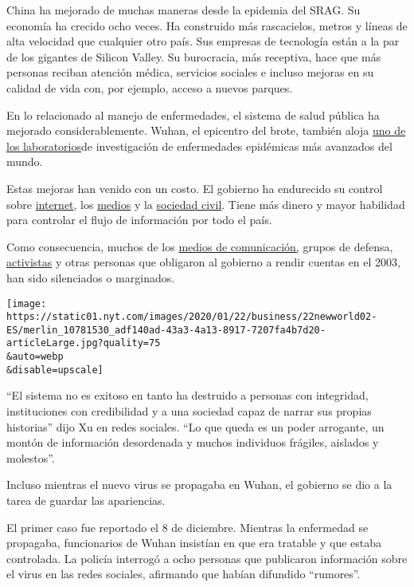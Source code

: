 China ha mejorado de muchas maneras desde la epidemia del SRAG. Su
economía ha crecido ocho veces. Ha construido más rascacielos, metros y
líneas de alta velocidad que cualquier otro país. Sus empresas de
tecnología están a la par de los gigantes de Silicon Valley. Su
burocracia, más receptiva, hace que más personas reciban atención
médica, servicios sociales e incluso mejoras en su calidad de vida con,
por ejemplo, acceso a nuevos parques.

En lo relacionado al manejo de enfermedades, el sistema de salud pública
ha mejorado considerablemente. Wuhan, el epicentro del brote, también
aloja
\href{https://twitter.com/ShanghaiEye/status/1093160842638446592}{uno de
los laboratorios}de investigación de enfermedades epidémicas más
avanzados del mundo.

Estas mejoras han venido con un costo. El gobierno ha endurecido su
control sobre
\href{https://www.nytimes.com/topic/destination/internet-censorship-in-china}{internet},
los
\href{https://www.nytimes.com/2019/07/12/world/asia/china-journalists-crackdown.html}{medios}
y la
\href{https://www.nytimes.com/2017/07/25/magazine/the-lonely-crusade-of-chinas-human-rights-lawyers.html}{sociedad
civil}. Tiene más dinero y mayor habilidad para controlar el flujo de
información por todo el país.

Como consecuencia, muchos de los
\href{https://www.nytimes.com/2004/01/07/international/asia/7-at-chinese-paper-held-after-articles-on-new-sars-case.html}{medios
de comunicación,} grupos de defensa,
\href{https://www.nytimes.com/2004/07/21/world/china-releases-the-sars-whistle-blower.html}{activistas}
y otras personas que obligaron al gobierno a rendir cuentas en el 2003,
han sido silenciados o marginados.

\texttt{[image: https://static01.nyt.com/images/2020/01/22/business/22newworld02-ES/merlin\_10781530\_adf140ad-43a3-4a13-8917-7207fa4b7d20-articleLarge.jpg?quality=75\\\&auto=webp\\\&disable=upscale]}

``El sistema no es exitoso en tanto ha destruido a personas con
integridad, instituciones con credibilidad y a una sociedad capaz de
narrar sus propias historias'' dijo Xu en redes sociales. ``Lo que queda
es un poder arrogante, un montón de información desordenada y muchos
individuos frágiles, aislados y molestos''.

Incluso mientras el nuevo virus se propagaba en Wuhan, el gobierno se
dio a la tarea de guardar las apariencias.

El primer caso fue reportado el 8 de diciembre. Mientras la enfermedad
se propagaba, funcionarios de Wuhan insistían en que era tratable y que
estaba controlada. La policía interrogó a ocho personas que publicaron
información sobre el virus en las redes sociales, afirmando que habían
difundido ``rumores''.

